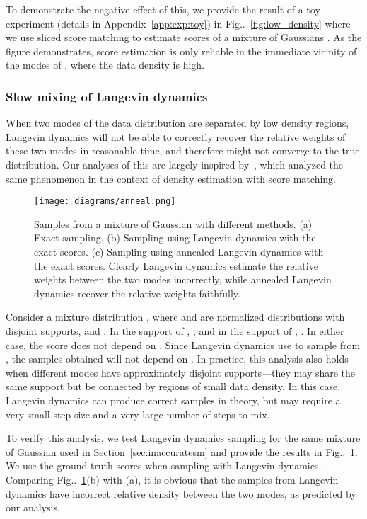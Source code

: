 \documentclass{article}
\makeatletter
\def\@onedot{\ifx\@let@token.\else.\null\fi\xspace}
\DeclareRobustCommand\onedot{\futurelet\@let@token\@onedot}
\newcommand{\figref}[1]{Fig\onedot~\ref{#1}}
\makeatother
\begin{document}
To demonstrate the negative effect of this, we provide the result of a toy experiment (details in Appendix~\ref{app:exp:toy}) in \figref{fig:low_density} where we use sliced score matching to estimate scores of a mixture of Gaussians . As the figure demonstrates, score estimation is only reliable in the immediate vicinity of the modes of , where the data density is high.

\subsubsection{Slow mixing of Langevin dynamics}

When two modes of the data distribution are separated by low density regions, Langevin dynamics will not be able to correctly recover the relative weights of these two modes in reasonable time, and therefore might not converge to the true distribution. Our analyses of this are largely inspired by~\cite{wenliang2018learning}, which analyzed the same phenomenon in the context of density estimation with score matching.

\begin{figure}[h]
    \centering
    \texttt{[image: diagrams/anneal.png]}
    \caption{Samples from a mixture of Gaussian with different methods. (a) Exact sampling. (b) Sampling using Langevin dynamics with the exact scores. (c) Sampling using annealed Langevin dynamics with the exact scores. Clearly Langevin dynamics estimate the relative weights between the two modes incorrectly, while annealed Langevin dynamics recover the relative weights faithfully.
    }
    \label{fig:anneal}
\end{figure}


Consider a mixture distribution , where  and  are normalized distributions with disjoint supports, and . In the support of , , and in the support of , . In either case, the score  does not depend on . Since Langevin dynamics use  to sample from , the samples obtained will not depend on . In practice, this analysis also holds when different modes have approximately disjoint supports---they may share the same support but be connected by regions of small data density. In this case, Langevin dynamics can produce correct samples in theory, but may require a very small step size and a very large number of steps to mix.

To verify this analysis, we test Langevin dynamics sampling for the same mixture of Gaussian used in Section~\ref{sec:inaccuratesm} and provide the results in \figref{fig:anneal}. We use the ground truth scores when sampling with Langevin dynamics. Comparing \figref{fig:anneal}(b) with (a), it is obvious that the samples from Langevin dynamics have incorrect relative density between the two modes, as predicted by our analysis.
\end{document}
